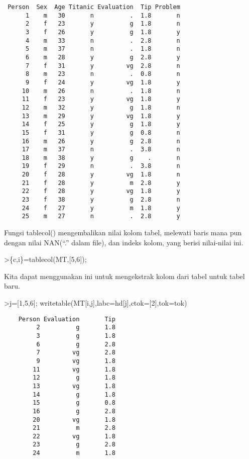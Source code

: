 \documentclass[
]{book}
\begin{document}
\begin{verbatim}
 Person  Sex  Age Titanic Evaluation  Tip Problem
      1    m   30       n          .  1.8       n
      2    f   23       y          g  1.8       n
      3    f   26       y          g  1.8       y
      4    m   33       n          .  2.8       n
      5    m   37       n          .  1.8       n
      6    m   28       y          g  2.8       y
      7    f   31       y         vg  2.8       n
      8    m   23       n          .  0.8       n
      9    f   24       y         vg  1.8       y
     10    m   26       n          .  1.8       n
     11    f   23       y         vg  1.8       y
     12    m   32       y          g  1.8       n
     13    m   29       y         vg  1.8       y
     14    f   25       y          g  1.8       y
     15    f   31       y          g  0.8       n
     16    m   26       y          g  2.8       n
     17    m   37       n          .  3.8       n
     18    m   38       y          g    .       n
     19    f   29       n          .  3.8       n
     20    f   28       y         vg  1.8       n
     21    f   28       y          m  2.8       y
     22    f   28       y         vg  1.8       y
     23    f   38       y          g  2.8       n
     24    f   27       y          m  1.8       y
     25    m   27       n          .  2.8       y
\end{verbatim}

Fungsi tablecol() mengembalikan nilai kolom tabel, melewati baris mana pun dengan nilai NAN(``.'' dalam file), dan indeks kolom, yang berisi nilai-nilai ini.

\textgreater\{c,i\}=tablecol(MT,{[}5,6{]});

Kita dapat menggunakan ini untuk mengekstrak kolom dari tabel untuk tabel baru.

\textgreater j={[}1,5,6{]}; writetable(MT{[}i,j{]},labc=hd{[}j{]},ctok={[}2{]},tok=tok)

\begin{verbatim}
    Person Evaluation       Tip
         2          g       1.8
         3          g       1.8
         6          g       2.8
         7         vg       2.8
         9         vg       1.8
        11         vg       1.8
        12          g       1.8
        13         vg       1.8
        14          g       1.8
        15          g       0.8
        16          g       2.8
        20         vg       1.8
        21          m       2.8
        22         vg       1.8
        23          g       2.8
        24          m       1.8
\end{verbatim}
\end{document}
